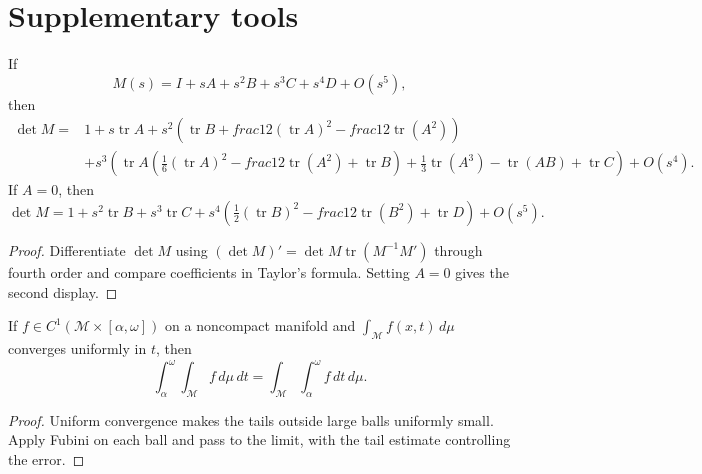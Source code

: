 \section{Supplementary tools}

\begin{lemma}
\label{lem:chow-iii-ch23-determinant-expansion}

If
\[
M(s)=I+sA+s^2B+s^3C+s^4D+O(s^5),
\]
then
\[
\begin{aligned}
\det M={}&1+s\operatorname{tr}A+s^2\left(\operatorname{tr}B+	frac12(\operatorname{tr}A)^2-	frac12\operatorname{tr}(A^2)\right)\\
&+s^3\left(\operatorname{tr}A(\tfrac16(\operatorname{tr}A)^2-	frac12\operatorname{tr}(A^2)+\operatorname{tr}B)+\tfrac13\operatorname{tr}(A^3)-\operatorname{tr}(AB)+\operatorname{tr}C\right)+O(s^4).
\end{aligned}
\]
If $A=0$, then
\[
\det M=1+s^2\operatorname{tr}B+s^3\operatorname{tr}C+s^4\left(\tfrac12(\operatorname{tr}B)^2-	frac12\operatorname{tr}(B^2)+\operatorname{tr}D\right)+O(s^5).
\]
\end{lemma}
\begin{proof}
\sketch Differentiate $\det M$ using
\( (\det M)'=\det M\operatorname{tr}(M^{-1}M')\) through fourth order and
compare coefficients in Taylor's formula.  Setting $A=0$ gives the second
display.
\end{proof}

\begin{lemma}
\label{lem:chow-iii-ch23-fubini-noncompact}

If $f\in C^1(\mathcal M\times[\alpha,\omega])$ on a noncompact manifold and
\(\int_{\mathcal M}f(x,t)\,d\mu\) converges uniformly in $t$, then
\[
\int_\alpha^\omega\int_{\mathcal M}f\,d\mu\,dt
=\int_{\mathcal M}\int_\alpha^\omega f\,dt\,d\mu.
\]
\end{lemma}
\begin{proof}
\sketch Uniform convergence makes the tails outside large balls uniformly small.  Apply
Fubini on each ball and pass to the limit, with the tail estimate controlling
the error.
\end{proof}

